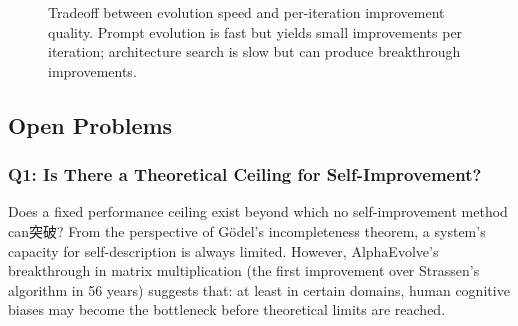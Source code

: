 \begin{figure}[htbp]
\centering
{}
\caption{Tradeoff between evolution speed and per-iteration improvement quality. Prompt evolution is fast but yields small improvements per iteration; architecture search is slow but can produce breakthrough improvements.}
\label{fig:ch3-speed-quality}
\end{figure}

\subsection{Open Problems}\label{sec:open-questions}

\subsubsection{Q1: Is There a Theoretical Ceiling for Self-Improvement?}

Does a fixed performance ceiling exist beyond which no self-improvement method can突破? From the perspective of G\"{o}del's incompleteness theorem, a system's capacity for self-description is always limited. However, AlphaEvolve's breakthrough in matrix multiplication (the first improvement over Strassen's algorithm in 56 years) suggests that: at least in certain domains, human cognitive biases may become the bottleneck before theoretical limits are reached.

